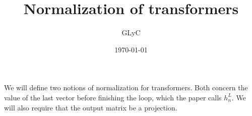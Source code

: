 \documentclass{article}
\title{Normalization of transformers}
\author{GLyC}
\date{\today}
\begin{document}
\maketitle

We will define two notions of normalization for transformers. Both concern the value of the last vector before finishing the loop, which the paper calls $h_n^L$. We will also require that the output matrix be a projection.




\end{document}
